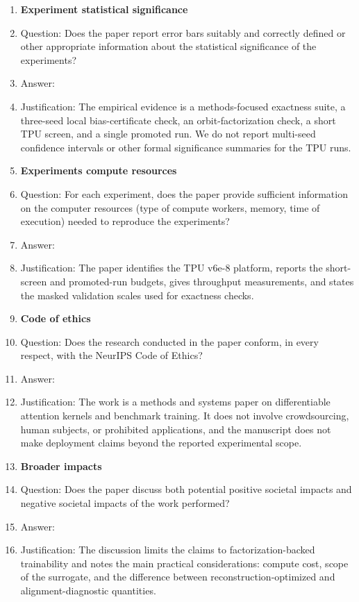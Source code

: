 \begin{enumerate}
\item {\bf Experiment statistical significance}
    \item[] Question: Does the paper report error bars suitably and correctly defined or other appropriate information about the statistical significance of the experiments?
    \item[] Answer: \answerNo{}
    \item[] Justification: The empirical evidence is a methods-focused exactness suite, a three-seed local bias-certificate check, an orbit-factorization check, a short TPU screen, and a single promoted run. We do not report multi-seed confidence intervals or other formal significance summaries for the TPU runs.

\item {\bf Experiments compute resources}
    \item[] Question: For each experiment, does the paper provide sufficient information on the computer resources (type of compute workers, memory, time of execution) needed to reproduce the experiments?
    \item[] Answer: \answerYes{}
    \item[] Justification: The paper identifies the TPU v6e-8 platform, reports the short-screen and promoted-run budgets, gives throughput measurements, and states the masked validation scales used for exactness checks.

\item {\bf Code of ethics}
    \item[] Question: Does the research conducted in the paper conform, in every respect, with the NeurIPS Code of Ethics?
    \item[] Answer: \answerYes{}
    \item[] Justification: The work is a methods and systems paper on differentiable attention kernels and benchmark training. It does not involve crowdsourcing, human subjects, or prohibited applications, and the manuscript does not make deployment claims beyond the reported experimental scope.

\item {\bf Broader impacts}
    \item[] Question: Does the paper discuss both potential positive societal impacts and negative societal impacts of the work performed?
    \item[] Answer: \answerYes{}
    \item[] Justification: The discussion limits the claims to factorization-backed trainability and notes the main practical considerations: compute cost, scope of the surrogate, and the difference between reconstruction-optimized and alignment-diagnostic quantities.


\end{enumerate}
